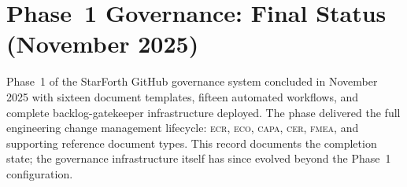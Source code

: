 
\section*{Phase~1 Governance: Final Status (November 2025)}

Phase~1 of the StarForth GitHub governance system concluded in November 2025
with sixteen document templates, fifteen automated workflows, and complete
backlog-gatekeeper infrastructure deployed. The phase delivered the full
engineering change management lifecycle: \textsc{ecr}, \textsc{eco},
\textsc{capa}, \textsc{cer}, \textsc{fmea}, and supporting reference
document types. This record documents the completion state; the governance
infrastructure itself has since evolved beyond the Phase~1 configuration.
